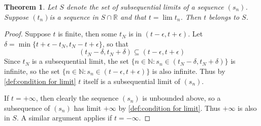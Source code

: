 \documentclass[12pt, lettersize]{book}
\theoremstyle{plain}
\newtheorem{thm}{Theorem}[section]
\theoremstyle{definition}
\theoremstyle{remark}
\begin{document}
		\begin{thm}
		Let $S$ denote the set of subsequential limits of a sequence $(s_n)$. Suppose $(t_n)$is a sequence in $S\cap\mathbb{R}$ and that $t=\lim t_n$. Then $t$ belongs to $S$.
		\end{thm}
		\begin{proof}
		Suppose $t$ is finite, then some $t_N$ is in $(t-\epsilon,t+\epsilon)$. Let $\delta=\min\{t+\epsilon-t_N,t_N-t+\epsilon\}$, so that
		\begin{displaymath}
			(t_N-\delta, t_N+\delta)\subseteq(t-\epsilon,t+\epsilon)
		\end{displaymath}
		Since $t_N$ is a subsequential limit, the set $\{n\in\mathbb{N}: s_n\in(t_N-\delta, t_N+\delta)\}$ is infinite,
		so the set $\{n\in\mathbb{N}: s_n\in(t-\epsilon, t+\epsilon)\}$ is also infinite. Thus by \ref{def:condition for limit} $t$ itself is a subsequential limit of $(s_n)$. 
		
		If $t=+\infty$, then clearly the sequence $(s_n)$ is unbounded above, so a subsequence of $(s_n)$ has limit $+\infty$ by \ref{def:condition for limit}. Thus $+\infty$ is also in $S$. A similar argument applies if $t=-\infty$.
		\end{proof}
		\newpage
		
\end{document}
